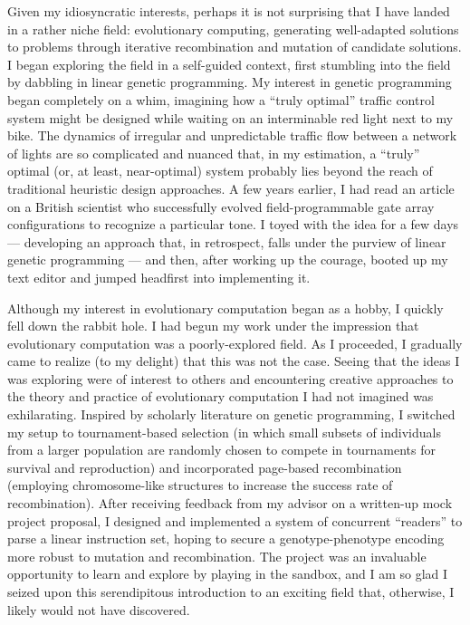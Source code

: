 \documentclass[12pt]{book}
\begin{document}

Given my idiosyncratic interests, perhaps it is not surprising that I have landed in a rather niche field: evolutionary computing, generating well-adapted solutions to problems through iterative recombination and mutation of candidate solutions. I began exploring the field in a self-guided context, first stumbling into the field by dabbling in linear genetic programming. My interest in genetic programming began completely on a whim, imagining how a “truly optimal” traffic control system might be designed while waiting on an interminable red light next to my bike. The dynamics of irregular and unpredictable traffic flow between a network of lights are so complicated and nuanced that, in my estimation, a “truly” optimal (or, at least, near-optimal) system probably lies beyond the reach of traditional heuristic design approaches. A few years earlier, I had read an article on a British scientist who successfully evolved field-programmable gate array configurations to recognize a particular tone. I toyed with the idea for a few days --- developing an approach that, in retrospect, falls under the purview of linear genetic programming --- and then, after working up the courage, booted up my text editor and jumped headfirst into implementing it. 
    
Although my interest in evolutionary computation began as a hobby, I quickly fell down the rabbit hole. I had begun my work under the impression that evolutionary computation was a poorly-explored field. As I proceeded, I gradually came to realize (to my delight) that this was not the case. Seeing that the ideas I was exploring were of interest to others and encountering creative approaches to the theory and practice of evolutionary computation I had not imagined was exhilarating. Inspired by scholarly literature on genetic programming, I switched my setup to tournament-based selection (in which small subsets of individuals from a larger population are randomly chosen to compete in tournaments for survival and reproduction) and incorporated page-based recombination (employing chromosome-like structures to increase the success rate of recombination). After receiving feedback from my advisor on a written-up mock project proposal, I designed and implemented a system of concurrent “readers” to parse a linear instruction set, hoping to secure a genotype-phenotype encoding more robust to mutation and recombination. The project was an invaluable opportunity to learn and explore by playing in the sandbox, and I am so glad I seized upon this serendipitous introduction to an exciting field that, otherwise, I likely would not have discovered.
\end{document}

